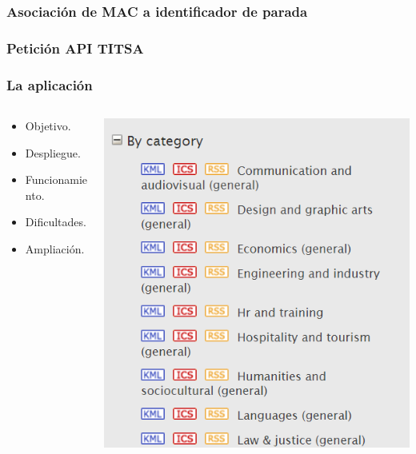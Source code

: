
\begin{frame}
	\frametitle{Asociación de MAC a identificador de parada}
	
\end{frame}


\begin{frame}
	\frametitle{Petición API TITSA}
	
\end{frame}


\begin{frame}
	\frametitle{La aplicación \BulletPoint{}}
	\begin{columns}
		\begin{column}{0.6\textwidth}
			\begin{itemize}
				\item Objetivo.
				\item Despliegue.
				\item Funcionamiento.
				\item Dificultades.
				\item Ampliación.
			\end{itemize}
			\endblock{}
		\end{column}
		\begin{column}{0.4\textwidth}
			\vfill 
			\begin{center}
				\includegraphics[width=0.7\linewidth]{Images/eventsRss}
			\end{center}
		\end{column}
	\end{columns}
\end{frame}

